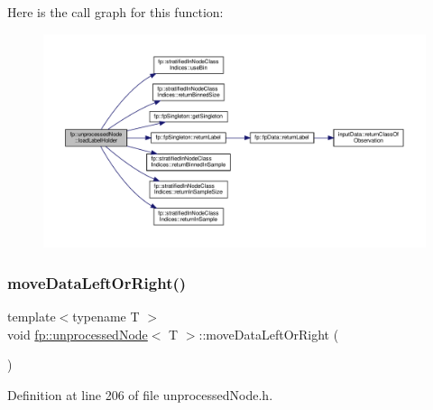 Here is the call graph for this function\+:\nopagebreak
\begin{figure}[H]
\begin{center}
\leavevmode
\includegraphics[width=350pt]{classfp_1_1unprocessedNode_a7b286c437f8f73fb3431358c11898a82_cgraph}
\end{center}
\end{figure}
\mbox{\label{classfp_1_1unprocessedNode_a0236d2722cb4c32b8ff7e66fc118bed2}} 
\subsubsection{\texorpdfstring{move\+Data\+Left\+Or\+Right()}{moveDataLeftOrRight()}}
{\footnotesize\ttfamily template$<$typename T $>$ \\
void \hyperlink{classfp_1_1unprocessedNode}{fp\+::unprocessed\+Node}$<$ T $>$\+::move\+Data\+Left\+Or\+Right (\begin{DoxyParamCaption}{ }\end{DoxyParamCaption})\hspace{0.3cm}{\ttfamily [inline]}}



Definition at line 206 of file unprocessed\+Node.\+h.


